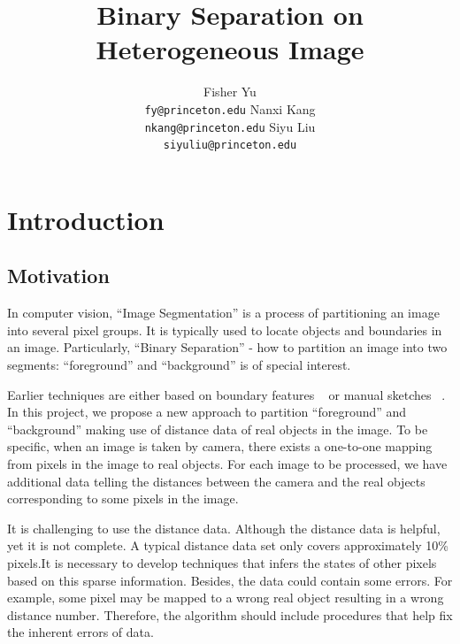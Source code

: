 \documentclass{article} %
\title{Binary Separation on Heterogeneous Image}
\author{
Fisher Yu \\
\texttt{fy@princeton.edu}
\And
Nanxi Kang \\
\texttt{nkang@princeton.edu} 
\And
Siyu Liu\\
\texttt{siyuliu@princeton.edu}
}
\begin{document}
\maketitle


\section{Introduction}

\subsection{Motivation}

In computer vision, ``Image Segmentation'' is a process of partitioning an
image into several pixel groups. It is typically used to locate
objects and boundaries in an image. Particularly, ``Binary Separation'' -
how to partition an image into two segments: ``foreground''
 and ``background'' is of special interest. 


Earlier techniques are either based on boundary features
~\citep{Kass1988snakes} or manual sketches
~\citep{Boykov2006graph}. In this project, we propose a new
approach to partition ``foreground'' and ``background'' making use of 
distance data of real objects in the image. To be specific, when an
image is taken by camera, there exists a
one-to-one mapping from pixels in the image to real objects. 
For each image to be processed, we have additional data telling the 
distances between the camera and the real objects corresponding to some
 pixels in the image. 

It is challenging to use the distance data. Although the distance data
is helpful, yet it is not complete. A typical distance data set only
covers approximately 10\% pixels.It is necessary to develop techniques
that infers the states of other pixels based on this sparse
information. Besides, the data could contain some errors. For example,
some pixel may be mapped to a wrong real object resulting in a wrong
distance number. Therefore, the algorithm should include procedures
that help fix the inherent errors of data. 
\end{document}
